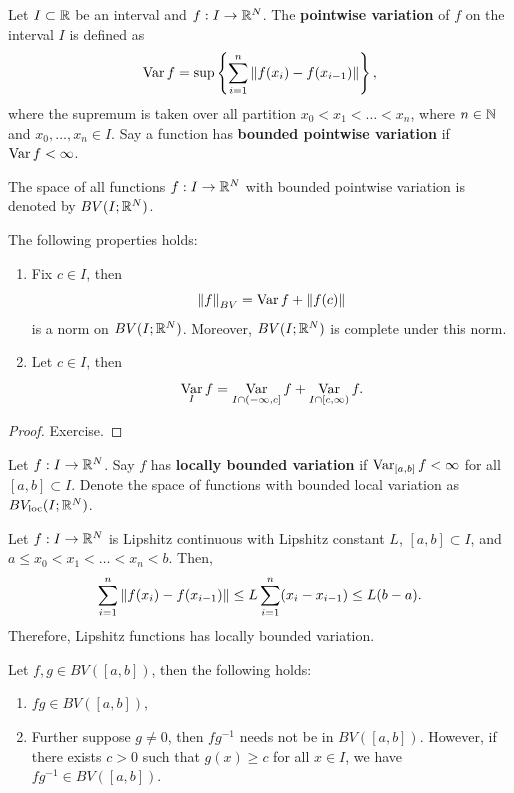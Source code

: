 \documentclass[a4paper]{article}
\begin{document}
\begin{defi}
  Let $I \subset \mathbb{R}$ be an interval and $f : I \to \mathbb{R}^N$. The
  \textbf{pointwise variation} of $f$ on the interval $I$ is defined as
  \[
    \operatorname*{Var} f = \sup \left\{  \sum_{i=1}^n \left\lVert f(x_i) - f(x_{i - 1})\right\rVert \right\},
  \]
  where the supremum is taken over all partition $x_0 < x_1 < \dots <
  x_n$, where $n \in \mathbb{N}$ and $x_0, \dots, x_n \in I$. Say a function has
  \textbf{bounded pointwise variation} if $\operatorname*{Var} f < \infty$.

  The space of all functions $f : I \to \mathbb{R}^N$ with bounded pointwise
  variation is denoted by $BV(I; \mathbb{R}^N)$.
\end{defi}

\begin{prop}
  The following properties holds:
  \begin{enumerate}
    \item Fix $c \in I$, then
          \[
            \left\lVert f\right\rVert_{BV} = \operatorname*{Var} f + \left\lVert f(c)\right\rVert
          \]
          is a norm on $BV(I; \mathbb{R}^N)$. Moreover, $BV(I; \mathbb{R}^N)$ is complete
          under this norm.

    \item Let $c \in I$, then
          \[
            \operatorname*{Var}_I f = \operatorname*{Var}_{I \cap (-\infty, c]} f
            + \operatorname*{Var}_{I \cap [c, \infty)} f.
          \]
  \end{enumerate}
\end{prop}

\begin{proof}
  Exercise.
\end{proof}

\begin{defi}
  Let $f : I \to \mathbb{R}^N$. Say $f$ has \textbf{locally bounded variation} if
  $\operatorname*{Var}_{[a, b]} f < \infty$ for all $[a, b] \subset I$. Denote the space
  of functions with bounded local variation as $BV_{\mathrm{loc}} (I ; \mathbb{R}^N)$.
\end{defi}

\begin{eg}
  Let $f : I \to \mathbb{R}^N$ is Lipshitz continuous with Lipshitz constant $L$,
  $[a, b] \subset I$, and $a \leq x_0 < x_1 < \dots < x_n < b$. Then,
  \[
    \sum_{i=1}^n \left\lVert f(x_i) - f(x_{i - 1})\right\rVert
    \leq L \sum_{i=1}^n (x_i - x_{i - 1})
    \leq L (b - a).
  \]
  Therefore, Lipshitz functions has locally bounded variation.
\end{eg}

\begin{ex}
  Let $f, g \in BV ([a, b])$, then the following holds:
  \begin{enumerate}
    \item $fg \in BV([a, b])$,
    \item Further suppose $g \neq 0$, then $f g^{-1}$ needs not be in $BV
          ([a, b])$. However, if there exists $c > 0$ such that $g(x) \geq
          c$ for all $x \in I$, we have $f g^{-1} \in BV ([a, b])$.
  \end{enumerate}
\end{ex}
\end{document}

